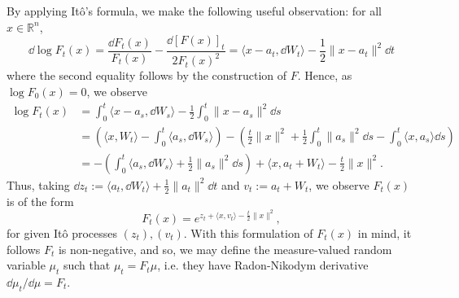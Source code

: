 By applying Itô's formula, we make the following useful observation: for all \(x \in \mathbb{R}^n\),
\begin{equation}
  \dd \log F_t(x) = \frac{\dd F_t(x)}{F_t(x)} - \frac{\dd\hspace{0pt} [F(x)]_t}{2F_t(x)^2} 
    = \langle x - a_t, \dd W_t \rangle - \frac{1}{2}\|x - a_t\|^2 \dd t
\end{equation}
where the second equality follows by the construction of \(F\). Hence, as \(\log F_0(x) = 0\), we 
observe
\begin{align*}
  \log F_t(x) & = \int_0^t \langle x - a_s, \dd W_s \rangle - \frac{1}{2}\int_0^t \|x - a_s\|^2 \dd s\\
    & = \left(\langle x, W_t \rangle - \int_0^t \langle a_s, \dd W_s \rangle\right)
      - \left(\frac{t}{2}\|x\|^2 + \frac{1}{2}\int_0^t\|a_s\|^2 \dd s - \int_0^t \langle x, a_s \rangle \dd s\right)\\
    & = - \left(\int_0^t \langle a_s, \dd W_s \rangle + \frac{1}{2}\|a_s\|^2 \dd s\right) + 
      \langle x, a_t + W_t \rangle - \frac{t}{2}\|x\|^2.
\end{align*}
Thus, taking \(\dd z_t := \langle a_t, \dd W_t\rangle + \frac{1}{2} \|a_t\|^2 \dd t\) and 
\(v_t := a_t + W_t\), we observe \(F_t(x)\) is of the form
\begin{equation}\label{eq:stoch_loc_alt}
  F_t(x) = e^{z_t + \langle x, v_t \rangle - \frac{t}{2}\|x\|^2},
\end{equation}
for given Itô processes \((z_t), (v_t)\).
With this formulation of \(F_t(x)\) in mind, it follows \(F_t\) is non-negative, and so, 
we may define the measure-valued random variable \(\mu_t\) such that \(\mu_t = F_t \mu\), i.e. they have
Radon-Nikodym derivative \(\dd \mu_t / \dd \mu = F_t\).

